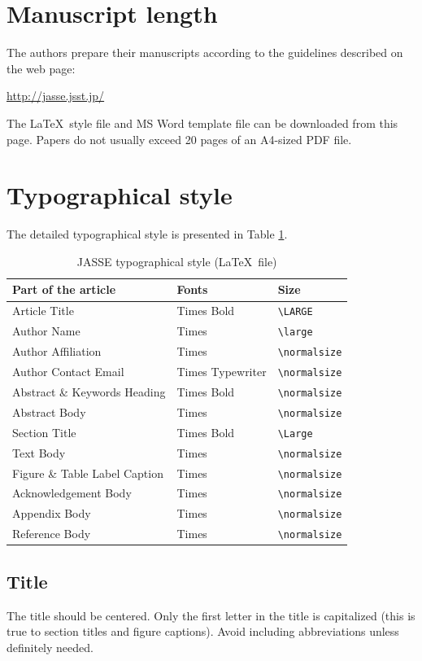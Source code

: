 \documentclass[journal]{jasse-modern}
\begin{document}
\section{Manuscript length}
The authors prepare their manuscripts according to the guidelines described on the web page:
\begin{center}
\url{http://jasse.jsst.jp/}
\end{center}
The \LaTeX~style file and MS Word template file can be downloaded from this page.
Papers do not usually exceed 20 pages of an A4-sized PDF file.

\section{Typographical style}
The detailed typographical style is presented in Table \ref{Typographical style}.
\begin{table}[ht]
\caption{JASSE typographical style (\LaTeX~file)}
\centering
\begin{tabular}{lll}
\hline
Part of the article & Fonts & Size\\
\hline
Article Title & Times Bold & \verb|\LARGE|\\
Author Name & Times & \verb|\large|\\
Author Affiliation & Times & \verb|\normalsize|\\
Author Contact Email & Times Typewriter& \verb|\normalsize|\\
Abstract \& Keywords Heading & Times Bold & \verb|\normalsize|\\
Abstract Body & Times & \verb|\normalsize|\\
Section Title & Times Bold & \verb|\Large|\\
Text Body & Times & \verb|\normalsize|\\
Figure \& Table Label Caption & Times & \verb|\normalsize|\\
Acknowledgement Body & Times & \verb|\normalsize|\\
Appendix Body & Times & \verb|\normalsize|\\
Reference Body & Times & \verb|\normalsize|\\
\hline
\end{tabular}
\label{Typographical style}
\end{table}%

\subsection{Title}
The title should be centered.
Only the first letter in the title is capitalized (this is true to section titles and figure captions). Avoid including abbreviations unless definitely needed.
\end{document}
